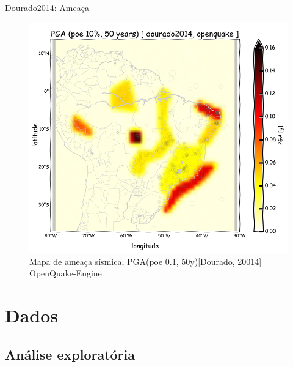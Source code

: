 \documentclass[ucs,8pt]{beamer}
\begin{document}
\begin{frame}{Dourado2014: Ameaça}
\begin{figure}[H]
  \centering
  \includegraphics[height=.95\textheight]{pga_dourado_oq} 
  \caption{Mapa de ameaça sísmica, PGA(poe 0.1, 50y)[Dourado, 20014] OpenQuake-Engine }
  \label{fig:pga_dourado_oq} 
\end{figure}
\end{frame}




\section{Dados}
\subsection{Análise exploratória}
\end{document}
